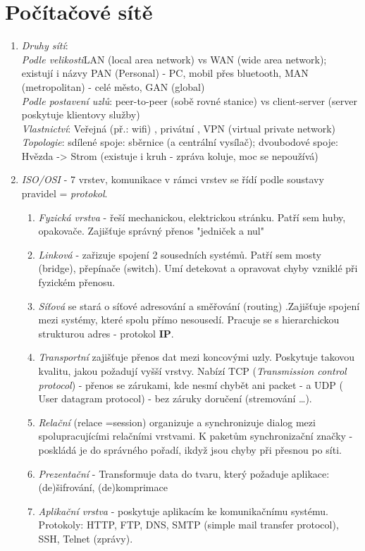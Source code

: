 \documentclass[12pt]{article}
\begin{document}
\section{Počítačové sítě}
\begin{enumerate}
\item \emph{Druhy sítí}:\\
\emph{Podle velikosti}LAN (local area network) vs WAN (wide area network); existují i názvy PAN (Personal) - PC, mobil přes bluetooth, MAN (metropolitan) - celé město, GAN (global)\\
\emph{Podle postavení uzlů}: peer-to-peer (sobě rovné stanice) vs client-server (server poskytuje klientovy služby)\\
\emph{Vlastnictví}: Veřejná (př.: wifi) , privátní , VPN (virtual private network)\\
\emph{Topologie}: 	sdílené spoje: sběrnice (a centrální vysílač); dvoubodové spoje: Hvězda -> Strom (existuje i kruh - zpráva koluje, moc se nepoužívá)
\item \emph{ISO/OSI} - 7 vrstev, komunikace v rámci vrstev se řídí podle soustavy pravidel = \emph{protokol}.
\begin{enumerate}
\item \emph{Fyzická vrstva} - řeší mechanickou, elektrickou stránku. Patří sem huby, opakovače. Zajišťuje správný přenos "jedniček a nul"
\item \emph{Linková} - zařizuje spojení 2 sousedních systémů. Patří sem mosty (bridge), přepínače (switch). Umí detekovat a opravovat chyby vzniklé při fyzickém přenosu.
\item \emph{Síťová} se stará o síťové adresování a směřování (routing) .Zajišťuje spojení mezi systémy, které spolu přímo nesousedí. Pracuje se s hierarchickou strukturou adres - protokol \textbf{IP}.
\item \emph{Transportní} zajišťuje přenos dat mezi koncovými uzly. Poskytuje takovou kvalitu, jakou požadují vyšší vrstvy. Nabízí TCP (\emph{Transmission control protocol}) - přenos se zárukami, kde nesmí chybět ani packet - a UDP ( User datagram protocol) - bez záruky doručení (stremování \dots).
\item \emph{Relační} (relace =session)  organizuje a synchronizuje dialog mezi spolupracujícími relačními vrstvami. K paketům synchronizační značky - poskládá je do správného pořadí, ikdyž jsou chyby při přesnou po síti.
\item \emph{Prezentační} - Transformuje data do tvaru, který požaduje aplikace: (de)šifrování, (de)komprimace
\item \emph{Aplikační vrstva} - poskytuje aplikacím ke komunikačnímu systému. Protokoly: HTTP, FTP, DNS, SMTP (simple mail transfer protocol), SSH, Telnet (zprávy).

\end{enumerate}
\end{enumerate}
\end{document}
